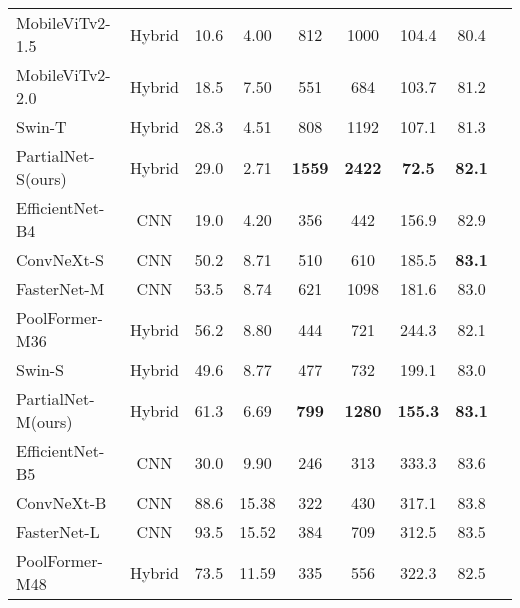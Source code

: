 \begin{table*}[ht]
{\begin{tabular}{@{}lcccccccc@{}}
    MobileViTv2-1.5\cite{Mehta2022}     & Hybrid          & 10.6             & 4.00  & 812        & 1000        & 104.4       & 80.4       \\
    MobileViTv2-2.0\cite{Mehta2022}     & Hybrid          & 18.5             & 7.50  & 551        & 684         & 103.7       & 81.2       \\
    Swin-T\cite{Liu2021c}               & Hybrid          & 28.3             & 4.51  & 808        & 1192        & 107.1       & 81.3       \\
    PartialNet-S(ours)                  & Hybrid          & 29.0             & 2.71  & {\bf 1559} & {\bf 2422}  & {\bf 72.5}  & {\bf 82.1} \\
    \hline
    EfficientNet-B4\cite{Tan2019}       & CNN             & 19.0             & 4.20  & 356        & 442         & 156.9       & 82.9       \\
    ConvNeXt-S\cite{Liu2022b}           & CNN             & 50.2             & 8.71  & 510        & 610         & 185.5       & {\bf 83.1} \\
    FasterNet-M\cite{Chen2023}          & CNN             & 53.5             & 8.74  & 621        & 1098        & 181.6       & 83.0       \\
    PoolFormer-M36\cite{Yu2022a}        & Hybrid          & 56.2             & 8.80  & 444        & 721         & 244.3       & 82.1       \\
    Swin-S\cite{Liu2021c}               & Hybrid          & 49.6             & 8.77  & 477        & 732         & 199.1       & 83.0       \\
    PartialNet-M(ours)                  & Hybrid          & 61.3             & 6.69  & {\bf 799}  & {\bf 1280}  & {\bf 155.3} & {\bf 83.1} \\
    \hline
    EfficientNet-B5\cite{Tan2019}       & CNN             & 30.0             & 9.90  & 246        & 313         & 333.3       & 83.6       \\
    ConvNeXt-B\cite{Liu2022b}           & CNN             & 88.6             & 15.38 & 322        & 430         & 317.1       & 83.8       \\
    FasterNet-L\cite{Chen2023}          & CNN             & 93.5             & 15.52 & 384        & 709         & 312.5       & 83.5       \\
    PoolFormer-M48\cite{Yu2022a}        & Hybrid          & 73.5             & 11.59 & 335        & 556         & 322.3       & 82.5       \\

\end{tabular}}
\end{table*}
